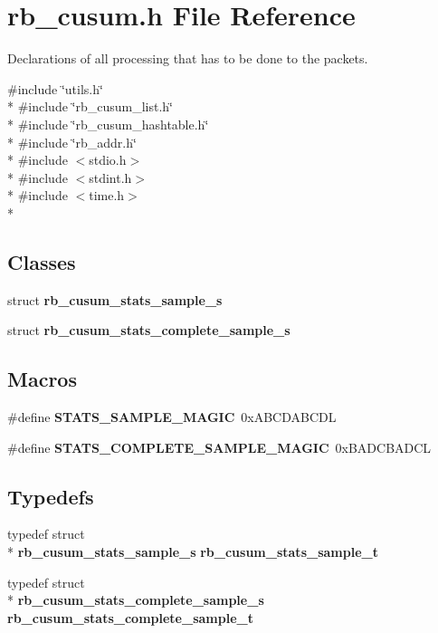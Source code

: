 \section{rb\+\_\+cusum.\+h File Reference}
\label{rb__cusum_8h}


Declarations of all processing that has to be done to the packets.  


{\ttfamily \#include \char`\"{}utils.\+h\char`\"{}}\\*
{\ttfamily \#include \char`\"{}rb\+\_\+cusum\+\_\+list.\+h\char`\"{}}\\*
{\ttfamily \#include \char`\"{}rb\+\_\+cusum\+\_\+hashtable.\+h\char`\"{}}\\*
{\ttfamily \#include \char`\"{}rb\+\_\+addr.\+h\char`\"{}}\\*
{\ttfamily \#include $<$stdio.\+h$>$}\\*
{\ttfamily \#include $<$stdint.\+h$>$}\\*
{\ttfamily \#include $<$time.\+h$>$}\\*
\subsection*{Classes}
\begin{DoxyCompactItemize}
\item 
struct {\bf rb\+\_\+cusum\+\_\+stats\+\_\+sample\+\_\+s}
\item 
struct {\bf rb\+\_\+cusum\+\_\+stats\+\_\+complete\+\_\+sample\+\_\+s}
\end{DoxyCompactItemize}
\subsection*{Macros}
\begin{DoxyCompactItemize}
\item 
\#define {\bf S\+T\+A\+T\+S\+\_\+\+S\+A\+M\+P\+L\+E\+\_\+\+M\+A\+G\+I\+C}~0x\+A\+B\+C\+D\+A\+B\+C\+D\+L
\item 
\#define {\bf S\+T\+A\+T\+S\+\_\+\+C\+O\+M\+P\+L\+E\+T\+E\+\_\+\+S\+A\+M\+P\+L\+E\+\_\+\+M\+A\+G\+I\+C}~0x\+B\+A\+D\+C\+B\+A\+D\+C\+L
\end{DoxyCompactItemize}
\subsection*{Typedefs}
\begin{DoxyCompactItemize}
\item 
typedef struct \\*
{\bf rb\+\_\+cusum\+\_\+stats\+\_\+sample\+\_\+s} {\bf rb\+\_\+cusum\+\_\+stats\+\_\+sample\+\_\+t}
\item 
typedef struct \\*
{\bf rb\+\_\+cusum\+\_\+stats\+\_\+complete\+\_\+sample\+\_\+s} {\bf rb\+\_\+cusum\+\_\+stats\+\_\+complete\+\_\+sample\+\_\+t}
\end{DoxyCompactItemize}
